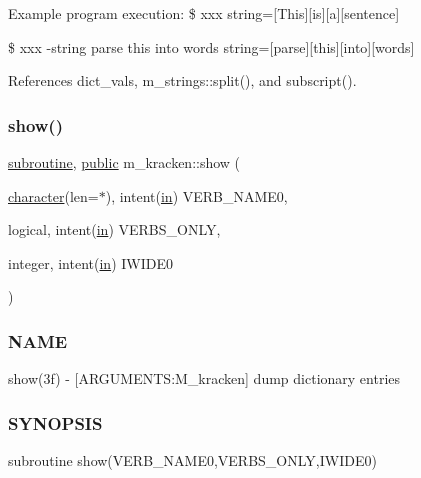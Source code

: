 Example program execution\+: \$ xxx string=\mbox{[}This\mbox{]}\mbox{[}is\mbox{]}\mbox{[}a\mbox{]}\mbox{[}sentence\mbox{]}

\$ xxx -\/string parse this into words string=\mbox{[}parse\mbox{]}\mbox{[}this\mbox{]}\mbox{[}into\mbox{]}\mbox{[}words\mbox{]} 

References dict\+\_\+vals, m\+\_\+strings\+::split(), and subscript().

\mbox{\label{namespacem__kracken_ae1bb0ffb2cd28ae8cc8fade9f1988c3c}} 
\subsubsection{\texorpdfstring{show()}{show()}}
{\footnotesize\ttfamily \hyperlink{M__stopwatch_83_8txt_acfbcff50169d691ff02d4a123ed70482}{subroutine}, \hyperlink{M__stopwatch_83_8txt_a2f74811300c361e53b430611a7d1769f}{public} m\+\_\+kracken\+::show (\begin{DoxyParamCaption}\item[{\hyperlink{option__stopwatch_83_8txt_abd4b21fbbd175834027b5224bfe97e66}{character}(len=$\ast$), intent(\hyperlink{M__journal_83_8txt_afce72651d1eed785a2132bee863b2f38}{in})}]{V\+E\+R\+B\+\_\+\+N\+A\+M\+E0,  }\item[{logical, intent(\hyperlink{M__journal_83_8txt_afce72651d1eed785a2132bee863b2f38}{in})}]{V\+E\+R\+B\+S\+\_\+\+O\+N\+LY,  }\item[{integer, intent(\hyperlink{M__journal_83_8txt_afce72651d1eed785a2132bee863b2f38}{in})}]{I\+W\+I\+D\+E0 }\end{DoxyParamCaption})}



\subsubsection*{N\+A\+ME}

show(3f) -\/ \mbox{[}A\+R\+G\+U\+M\+E\+N\+TS\+:M\+\_\+kracken\mbox{]} dump dictionary entries 

\subsubsection*{S\+Y\+N\+O\+P\+S\+IS}

subroutine show(\+V\+E\+R\+B\+\_\+\+N\+A\+M\+E0,\+V\+E\+R\+B\+S\+\_\+\+O\+N\+L\+Y,\+I\+W\+I\+D\+E0)

